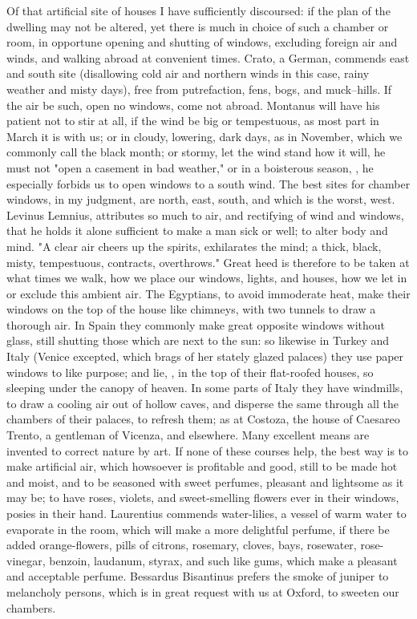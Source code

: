 {Of that artificial site of houses I have sufficiently discoursed: if the plan of the dwelling may not be altered, yet there is much in choice of such a chamber or room, in opportune opening and shutting of windows, excluding foreign air and winds, and walking abroad at convenient times. Crato, a German, commends east and south site (disallowing cold air and northern winds in this case, rainy weather and misty days), free from putrefaction, fens, bogs, and muck--hills. If the air be such, open no windows, come not abroad. Montanus will have his patient not to stir at all, if the wind be big or tempestuous, as most part in March it is with us; or in cloudy, lowering, dark days, as in November, which we commonly call the black month; or stormy, let the wind stand how it will,  he must not "open a casement in bad weather," or in a boisterous season, , he especially forbids us to open windows to a south wind. The best sites for chamber windows, in my judgment, are north, east, south, and which is the worst, west. Levinus Lemnius,  attributes so much to air, and rectifying of wind and windows, that he holds it alone sufficient to make a man sick or well; to alter body and mind. "A clear air cheers up the spirits, exhilarates the mind; a thick, black, misty, tempestuous, contracts, overthrows." Great heed is therefore to be taken at what times we walk, how we place our windows, lights, and houses, how we let in or exclude this ambient air. The Egyptians, to avoid immoderate heat, make their windows on the top of the house like chimneys, with two tunnels to draw a thorough air. In Spain they commonly make great opposite windows without glass, still shutting those which are next to the sun: so likewise in Turkey and Italy (Venice excepted, which brags of her stately glazed palaces) they use paper windows to like purpose; and lie, , in the top of their flat-roofed houses, so sleeping under the canopy of heaven. In some parts of Italy they have windmills, to draw a cooling air out of hollow caves, and disperse the same through all the chambers of their palaces, to refresh them; as at Costoza, the house of Caesareo Trento, a gentleman of Vicenza, and elsewhere. Many excellent means are invented to correct nature by art. If none of these courses help, the best way is to make artificial air, which howsoever is profitable and good, still to be made hot and moist, and to be seasoned with sweet perfumes, pleasant and lightsome as it may be; to have roses, violets, and sweet-smelling flowers ever in their windows, posies in their hand. Laurentius commends water-lilies, a vessel of warm water to evaporate in the room, which will make a more delightful perfume, if there be added orange-flowers, pills of citrons, rosemary, cloves, bays, rosewater, rose-vinegar, benzoin, laudanum, styrax, and such like gums, which make a pleasant and acceptable perfume. Bessardus Bisantinus prefers the smoke of juniper to melancholy persons, which is in great request with us at Oxford, to sweeten our chambers. }
